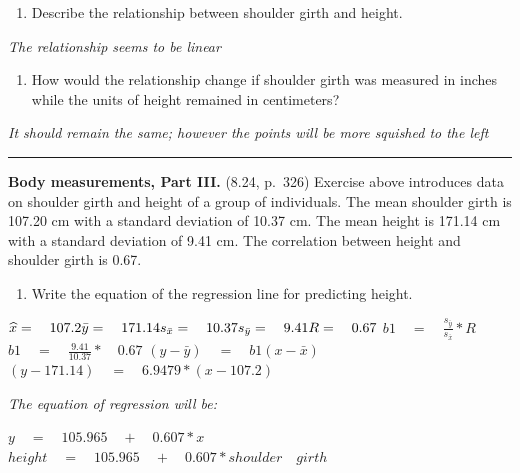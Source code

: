\documentclass[]{article}
\providecommand{\tightlist}{%
  \setlength{\itemsep}{0pt}\setlength{\parskip}{0pt}}
\begin{document}
\begin{enumerate}
\def\labelenumi{(\alph{enumi})}
\tightlist
\item
  Describe the relationship between shoulder girth and height.
\end{enumerate}

\emph{The relationship seems to be linear}

\begin{enumerate}
\def\labelenumi{(\alph{enumi})}
\setcounter{enumi}{1}
\tightlist
\item
  How would the relationship change if shoulder girth was measured in
  inches while the units of height remained in centimeters?
\end{enumerate}

\emph{It should remain the same; however the points will be more
squished to the left}

\begin{center}\rule{0.5\linewidth}{\linethickness}\end{center}

\clearpage

\textbf{Body measurements, Part III.} (8.24, p.~326) Exercise above
introduces data on shoulder girth and height of a group of individuals.
The mean shoulder girth is 107.20 cm with a standard deviation of 10.37
cm. The mean height is 171.14 cm with a standard deviation of 9.41 cm.
The correlation between height and shoulder girth is 0.67.

\begin{enumerate}
\def\labelenumi{(\alph{enumi})}
\tightlist
\item
  Write the equation of the regression line for predicting height.
\end{enumerate}

\(\widehat{ x } =\quad 107.2\\ \bar{ y } =\quad 171.14\\ { s }_{ \bar{ x } }=\quad 10.37\\ { s }_{ \bar{ y } }=\quad 9.41\\ { R } =\quad 0.67\)
\(b1\quad =\quad \frac { { s }_{ \bar{ y } } }{ { s }_{ \bar{ x } } } *{ R }\)
\(b1\quad =\quad \frac { 9.41 }{ 10.37 } *\quad 0.67\)
\((y-\bar{ y } )\quad =\quad b1(x-\bar{ x } )\)
\((y-171.14)\quad =\quad 6.9479*(x-107.2)\)

\emph{The equation of regression will be:}

\(y\quad =\quad 105.965\quad +\quad 0.607*x\)
\(height\quad =\quad 105.965\quad +\quad 0.607*shoulder\quad girth\)
\end{document}
